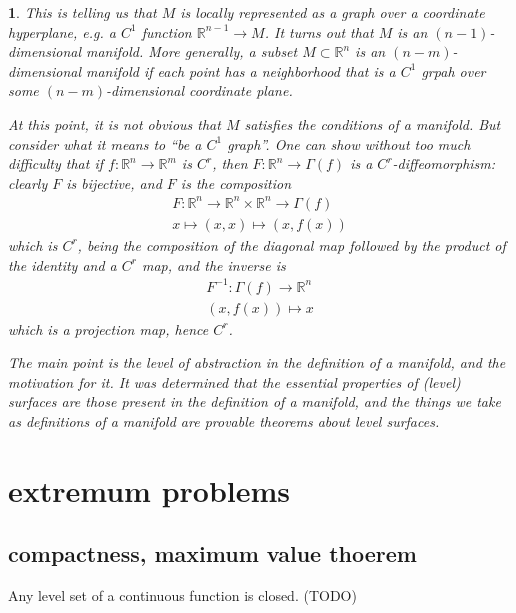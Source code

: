 \documentclass[12pt]{article}
\newtheorem{para}[theorem]{}
\begin{document}
\begin{para} 
	This is telling us that $M$ is locally represented as a graph over a coordinate hyperplane, e.g. a $C^1$ function $\mathbb{R}^{n-1}\to M$. It turns out that $M$ is an $(n-1)$-dimensional manifold. More generally, a subset $M\subset\mathbb{R}^n$ is an $(n-m)$-dimensional manifold if each point has a neighborhood that is a $C^1$ grpah over some $(n-m)$-dimensional coordinate plane. 

	At this point, it is not obvious that $M$ satisfies the conditions of a manifold. But consider what it means to ``be a $C^1$ graph''. One can show without too much difficulty that if $f:\mathbb{R}^n\to\mathbb{R}^m$ is $C^r$, then $F:\mathbb{R}^n\to\Gamma(f)$ is a $C^r$-diffeomorphism: clearly $F$ is bijective, and $F$ is the composition 
	\begin{gather*}
		F:\mathbb{R}^n \to \mathbb{R}^n\times\mathbb{R}^n \to \Gamma(f) \\
		x\mapsto (x,x) \mapsto (x,f(x))
	\end{gather*}
	which is $C^r$, being the composition of the diagonal map followed by the product of the identity and a $C^r$ map, and the inverse is 
	\begin{gather*}
		F^{-1}: \Gamma(f) \to \mathbb{R}^n \\
		(x,f(x))\mapsto x
	\end{gather*}
	which is a projection map, hence $C^r$.

	The main point is the level of abstraction in the definition of a manifold, and the motivation for it. It was determined that the essential properties of (level) surfaces are those present in the definition of a manifold, and the things we take as definitions of a manifold are provable theorems about level surfaces.
\end{para}	



\section{extremum problems} %

\subsection{compactness, maximum value thoerem} %

\begin{example}
	Any level set of a continuous function is closed. (TODO)
\end{example}
\end{document}
